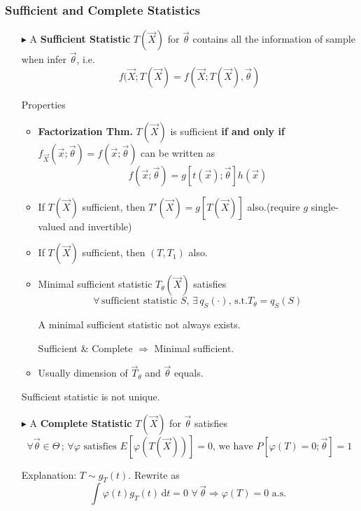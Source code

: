 \documentclass[11pt,a4paper]{ctexart}
\numberwithin{equation}{section}%
\begin{document}
\subsubsection{Sufficient and Complete Statistics}\label{SubSectionSufficient_CompleteStatistics}
    \begin{itemize}
        \item[$\blacktriangleright$] A \textbf{Sufficient Statistic} $T(\vec{X})$ for $\vec{\theta}$ contains all the information of sample when infer $\vec{\theta}$, i.e.
        \[
            f(\vec{X};T(\vec{X})=f(\vec{X};T(\vec{X}),\vec{\theta})
        \]

        Properties
        \begin{itemize}
            \item \textbf{Factorization Thm.} $T(\vec{X})$ is sufficient \textbf{if and only if} $f_{\vec{X}}(\vec{x};\vec{\theta})=f(\vec{x};\vec{\theta})$ can be written as 
            \[
                f(\vec{x};\vec{\theta})=g[t(\vec{x});\vec{\theta}]h(\vec{x})
            \]            
            \item If $T(\vec{X})$ sufficient, then $T'(\vec{X})=g[T(\vec{X})]$ also.(require $g$ single-valued and invertible)
            \item If $T(\vec{X})$ sufficient, then $(T,T_1)$ also.
            \item Minimal sufficient statistic $T_\theta(\vec{X})$ satisfies 
            \[
                \forall\,\text{sufficient statistic }S,\,\exists\, q_S(\cdot),\, \text{s.t.} T_\theta=q_S(S)
            \]

            A minimal sufficient statistic not always exists.

            Sufficient \& Complete $\Rightarrow $ Minimal sufficient.
            \item Usually dimension of $\vec{T}_\theta$ and $\vec{\theta}$ equals.
        \end{itemize}
        
        Sufficient statistic is not unique.



        \item[$\blacktriangleright$] A \textbf{Complete Statistic} $T(\vec{X})$ for $\vec{\theta}$ satisfies
        \[
            \forall\vec{\theta}\in\Theta\, ;\,\forall\varphi\text{ satisfies }E[\varphi(T(\vec{X}))]=0\text{, we have }P[\varphi(T)=0;\vec{\theta}]=1
        \]

        Explanation: $T\sim g_T(t)$. Rewrite as
        \[
            \int\varphi (t) g_T(t)\,\mathrm{d} t=0  \,\,\forall\, \vec{\theta}\Rightarrow\varphi(T)=0 \text{  a.s. }
        \]


\end{itemize}
\end{document}
